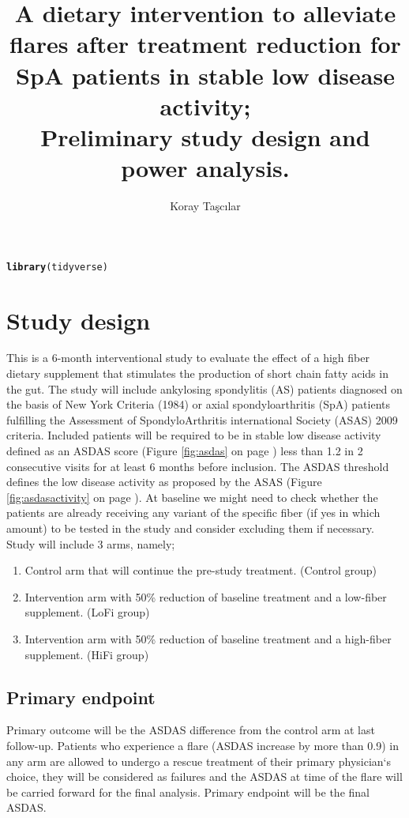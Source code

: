 \documentclass{article}\usepackage[]{graphicx}\usepackage[]{color}
\title{A dietary intervention to alleviate flares after treatment reduction for SpA patients in stable low disease activity;\\Preliminary study design and power analysis.}
\author{Koray Taşcılar}
\makeatletter
\newcommand{\hlstd}[1]{\textcolor[rgb]{0.345,0.345,0.345}{#1}}%
\newcommand{\hlkwd}[1]{\textcolor[rgb]{0.737,0.353,0.396}{\textbf{#1}}}%
\newenvironment{kframe}{%
 \def\at@end@of@kframe{}%
 \ifinner\ifhmode%
  \def\at@end@of@kframe{\end{minipage}}%
  \begin{minipage}{\columnwidth}%
 \fi\fi%
 \def\FrameCommand##1{\hskip\@totalleftmargin \hskip-\fboxsep
 \colorbox{shadecolor}{##1}\hskip-\fboxsep
     \hskip-\linewidth \hskip-\@totalleftmargin \hskip\columnwidth}%
 \MakeFramed {\advance\hsize-\width
   \@totalleftmargin\z@ \linewidth\hsize
   \@setminipage}}%
 {\par\unskip\endMakeFramed%
 \at@end@of@kframe}
\newenvironment{knitrout}{}{} %
\makeatother
\begin{document}
\maketitle

\begin{knitrout}
\color{fgcolor}\begin{kframe}
\begin{alltt}
\hlkwd{library}\hlstd{(tidyverse)}
\end{alltt}
\end{kframe}
\end{knitrout}

\section {Study design}
This is a 6-month interventional study to evaluate the effect of a high fiber dietary supplement that stimulates the production of short chain fatty acids in the gut. The study will include ankylosing spondylitis (AS) patients diagnosed on the basis of New York Criteria (1984) or axial spondyloarthritis (SpA) patients fulfilling the Assessment of SpondyloArthritis international Society (ASAS) 2009 criteria. Included patients will be required to be in stable low disease activity defined as an ASDAS score (Figure \ref{fig:asdas} on page \pageref{fig:asdas}) less than 1.2 in 2 consecutive visits for at least 6 months before inclusion. The ASDAS threshold defines the low disease activity as proposed by the  ASAS (Figure \ref{fig:asdasactivity} on page \pageref{fig:asdasactivity}). At baseline we might need to check whether the patients are already receiving any variant of the specific fiber (if yes in which amount) to be tested in the study and consider excluding them if necessary. Study will include 3 arms, namely;
\begin{enumerate}
  \item Control arm that will continue the pre-study treatment. (Control group)
  \item Intervention arm with 50\% reduction of baseline treatment and a low-fiber supplement. (LoFi group)
  \item Intervention arm with 50\% reduction of baseline treatment and a high-fiber supplement. (HiFi group)
\end{enumerate}
\subsection{Primary endpoint}
Primary outcome will be the ASDAS difference from the control arm at last follow-up.
Patients who experience a flare (ASDAS increase by more than 0.9) in any arm are allowed to undergo a rescue treatment of their primary physician‘s choice, they will be considered as failures and the ASDAS at time of the flare will be carried forward for the final analysis.
Primary endpoint will be the final ASDAS.
\end{document}
